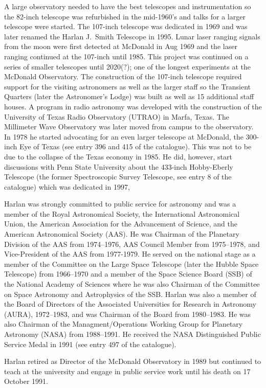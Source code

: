A large observatory needed to have the best telescopes and
instrumentation so the 82-inch telescope was refurbished in the
mid-1960's and talks for a larger telescope were started.  The
107-inch telescope was dedicated in 1969 and was later renamed the
Harlan J.~Smith Telescope in 1995. Lunar laser ranging signals from
the moon were first detected at McDonald in Aug 1969 and the laser
ranging continued at the 107-inch until 1985. This project was
continued on a series of smaller telescopes until 2020(?);
one of the longest experiments at the McDonald Observatory. The
construction of the 107-inch telescope required support for the
visiting astronomers as well as the larger staff so the Transient
Quarters (later the Astronomer's Lodge) was built as well as 15
additional staff houses. A program in radio astronomy was developed
with the construction of the University of Texas Radio Observatory
(UTRAO) in Marfa, Texas. The Millimeter Wave Observatory was later
moved from campus to the observatory. In 1978 he started advocating
for an even larger telescope at McDonald, the 300-inch Eye of Texas
(see entry 396 and 415 of the catalogue). This was not to be due to the
collapse of the Texas economy in 1985. He did, however, start
discussions with Penn State University about the 433-inch Hobby-Eberly
Telescope (the former Spectroscopic Survey Telescope, see entry 8 of
the catalogue) which was dedicated in 1997,

Harlan was strongly committed to public service for astronomy and was
a member of the Royal Astronomical Society, the International
Astronomical Union, the American Association for the Advancement of
Science, and the American Astronomical Society (AAS). He was Chairman of the
Planetary Division of the AAS from 1974--1976, AAS Council Member from
1975--1978, and Vice-President of the AAS from 1977-1979. He served on
the national stage as a member of the Committee on the Large Space
Telescope (later the Hubble Space Telescope) from 1966--1970 and a
member of the Space Science Board (SSB) of the National Academy of
Sciences where he was also Chairman of the Committee on Space
Astronomy and Astrophysics of the SSB. Harlan was also a member of the
Board of Directors of the Associated Universities for Research in
Astronomy (AURA), 1972--1983, and was Chairman of the Board from
1980--1983. He was also Chairman of the Managment/Operations Working
Group for Planetary Astronomy (NASA) from 1988--1991.  He received
the NASA Distinguished Public Service Medal in 1991 (see entry 497 of
the catalogue).

Harlan retired as Director of the McDonald Observatory in 1989 but
continued to teach at the university and engage in public service work
until his death on 17 October 1991.


